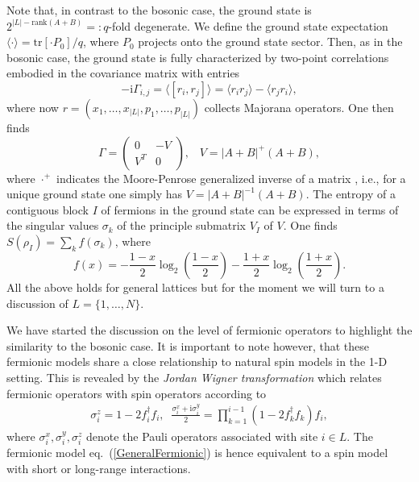 \documentclass[12pt, rmp,floatfix,epsfig,graphics]{revtex4} %
\newcommand{\mi}{\mathrm{i} }
\begin{document}
Note that, in contrast to the bosonic case, the ground state 
is $2^{|L|-\text{rank}(A+B)}=:q$-fold degenerate. We define
the ground state expectation $\langle\cdot\rangle=\text{tr}
[\cdot P_0]/q$, where $P_0$ projects onto the ground state 
sector. Then, as in the bosonic case, the ground state is 
fully characterized by two-point correlations embodied in 
the covariance matrix with entries
\begin{equation*}
        -\mi\Gamma_{i,j} = \langle\left[r_i,r_j\right]\rangle
        = \langle r_ir_j\rangle-\langle r_jr_i\rangle,
\end{equation*}
where now $r=(x_1,\dots,x_{|L|},p_1,\dots,p_{|L|})$ collects 
Majorana operators. One then finds
\begin{equation}\label{FermionicGamma}
        \Gamma=\left(\begin{array}{cc}
           0&-V\\
           V^T&0
        \end{array}\right),\;\;\; V=|A+B|^{+}(A+B),
\end{equation} 
where $\cdot^+$ indicates the Moore-Penrose generalized inverse 
of a matrix \cite{HornJohnson}, i.e., for a unique ground state one 
simply has $V=|A+B|^{-1}(A+B)$. The entropy of a contiguous
block $I$ of fermions in the ground state can be expressed 
in terms of the singular values $\sigma_k$ of the principle submatrix 
$V_I$ of $V$. One finds $S(\rho_I)=\sum_{k}f(\sigma_k)$, 
where
\begin{equation}
\label{fermionEntropy}
        f(x)=-\frac{1-x}{2}\log_2\left(\frac{1-x}{2}\right)-
        \frac{1+x}{2}\log_2\left(\frac{1+x}{2}\right).
\end{equation}
All the above holds for general lattices but for the moment
we will turn to a discussion of $L=\{1,\dots, N\}$.

We have started the discussion on the level of fermionic
operators to highlight the similarity to the bosonic case. It
is important to note however, that these fermionic models share 
a close relationship to natural spin models in the 1-D setting.
This is revealed by the {\it Jordan Wigner transformation} which 
relates fermionic operators with spin operators according to
\begin{eqnarray}
        \sigma^z_i= 1- 2 f_i^\dagger f_i,\;\;
        \frac{\sigma^x_i+ \mi \sigma^y_i}{2} = \prod_{k=1}^{i-1} (1-2 f_k^\dagger f_k) f_i,
\end{eqnarray}
where $\sigma^x_i,\sigma^y_i,\sigma^z_i$ denote the Pauli 
operators associated with site $i\in L$. The fermionic model 
eq.\ (\ref{GeneralFermionic}) is hence equivalent to a spin model 
with short or long-range interactions.
\end{document}
